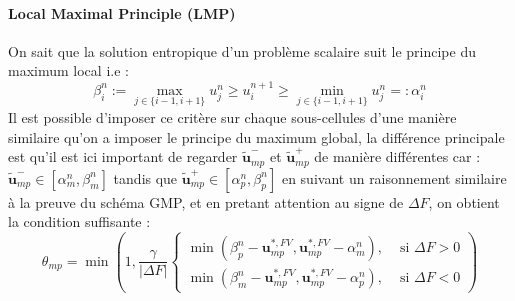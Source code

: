 \paragraph{Local  Maximal Principle (LMP)}
On sait que la solution entropique d'un problème scalaire suit le principe du maximum local i.e : 
\begin{equation}
    \beta_i^n := \max_{j\in\{i-1,i+1\}} u_j^n \geq u_i^{n+1} \geq \min_{j\in\{i-1,i+1\}} u_j^n =: \alpha_i^n
\end{equation}
Il est possible d'imposer ce critère sur chaque sous-cellules d'une manière similaire qu'on a imposer le principe du maximum global,
la différence principale est qu'il est ici important de regarder $\widetilde{\mathbf{u}}_{mp}^{-}$ et $\widetilde{\mathbf{u}}_{mp}^{+}$ de manière différentes car :
$\widetilde{\mathbf{u}}_{mp}^{-} \in \left[\alpha_m^n, \beta_m^n \right]$ tandis que $\widetilde{\mathbf{u}}_{mp}^{+} \in \left[\alpha_p^n, \beta_p^n \right]$
en suivant un raisonnement similaire à la preuve du schéma GMP, et en pretant attention au signe de $\Delta F$, on obtient la condition suffisante : 
\begin{equation}
\theta_{mp} = \min \left(1, \frac{\gamma}{|\Delta F|}  \left\{
    \begin{aligned}
    \min\left( \beta_{p}^n-\mathbf{u}_{mp}^{*,FV},\mathbf{u}_{mp}^{*,FV} - \alpha_{m}^n \right), &\text{ si }\Delta F >0  \\
    \min\left( \beta_{m}^n-\mathbf{u}_{mp}^{*,FV},\mathbf{u}_{mp}^{*,FV} - \alpha_{p}^n \right), &\text{ si }\Delta F <0  
    \end{aligned}\right.
    \right)
\end{equation}

